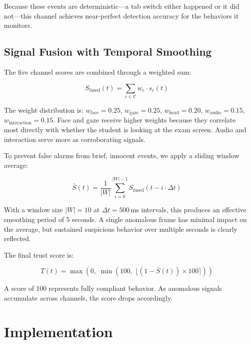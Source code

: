\documentclass[conference]{IEEEtran}
\begin{document}
Because these events are deterministic---a tab switch either happened or it did not---this channel achieves near-perfect detection accuracy for the behaviors it monitors.

\subsection{Signal Fusion with Temporal Smoothing}

The five channel scores are combined through a weighted sum:

\begin{equation}
    S_{\text{fused}}(t) = \sum_{c \in \mathcal{C}} w_c \cdot s_c(t)
    \label{eq:fusion}
\end{equation}

The weight distribution is: $w_{\text{face}} = 0.25$, $w_{\text{gaze}} = 0.25$, $w_{\text{head}} = 0.20$, $w_{\text{audio}} = 0.15$, $w_{\text{interaction}} = 0.15$. Face and gaze receive higher weights because they correlate most directly with whether the student is looking at the exam screen. Audio and interaction serve more as corroborating signals.

To prevent false alarms from brief, innocent events, we apply a sliding window average:

\begin{equation}
    \bar{S}(t) = \frac{1}{|W|}\sum_{i=0}^{|W|-1} S_{\text{fused}}(t - i \cdot \Delta t)
    \label{eq:smoothing}
\end{equation}

With a window size $|W| = 10$ at $\Delta t = 500$\,ms intervals, this produces an effective smoothing period of 5 seconds. A single anomalous frame has minimal impact on the average, but sustained suspicious behavior over multiple seconds is clearly reflected.

The final trust score is:

\begin{equation}
    T(t) = \max\left(0, \; \min\left(100, \; \lfloor(1 - \bar{S}(t)) \times 100\rceil\right)\right)
    \label{eq:trust}
\end{equation}

A score of 100 represents fully compliant behavior. As anomalous signals accumulate across channels, the score drops accordingly.

\section{Implementation}
\end{document}
